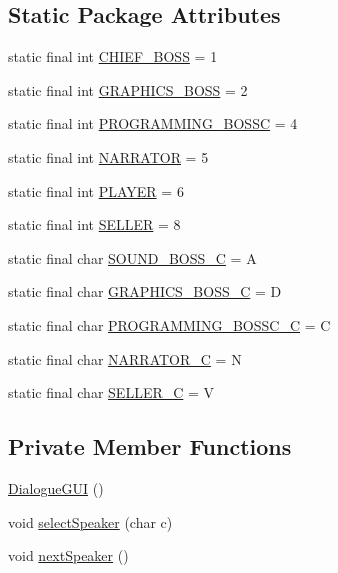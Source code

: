 \subsection*{Static Package Attributes}
\begin{DoxyCompactItemize}
\item 
static final int \mbox{\hyperlink{classgui_1_1_dialogue_g_u_i_aac66d699b6ad6303bb963686bf677e20}{C\+H\+I\+E\+F\+\_\+\+B\+O\+SS}} = 1
\item 
static final int \mbox{\hyperlink{classgui_1_1_dialogue_g_u_i_a6bdff5618468be0a1f501ba3ede32938}{G\+R\+A\+P\+H\+I\+C\+S\+\_\+\+B\+O\+SS}} = 2
\item 
static final int \mbox{\hyperlink{classgui_1_1_dialogue_g_u_i_acc13d83992d3758489e88bd5b4710642}{P\+R\+O\+G\+R\+A\+M\+M\+I\+N\+G\+\_\+\+B\+O\+S\+SC}} = 4
\item 
static final int \mbox{\hyperlink{classgui_1_1_dialogue_g_u_i_af2b0155eb06848c3394af0eba4c9253c}{N\+A\+R\+R\+A\+T\+OR}} = 5
\item 
static final int \mbox{\hyperlink{classgui_1_1_dialogue_g_u_i_a4225bf53175bddf0e95670cf1706f98c}{P\+L\+A\+Y\+ER}} = 6
\item 
static final int \mbox{\hyperlink{classgui_1_1_dialogue_g_u_i_afd8f9475334f31369e54a6210e7f74fc}{S\+E\+L\+L\+ER}} = 8
\item 
static final char \mbox{\hyperlink{classgui_1_1_dialogue_g_u_i_a573395c5551a6b3973ee5eddf5209a85}{S\+O\+U\+N\+D\+\_\+\+B\+O\+S\+S\+\_\+C}} = \textquotesingle{}A\textquotesingle{}
\item 
static final char \mbox{\hyperlink{classgui_1_1_dialogue_g_u_i_a80ed88913fb7e896313a5982f6676504}{G\+R\+A\+P\+H\+I\+C\+S\+\_\+\+B\+O\+S\+S\+\_\+C}} = \textquotesingle{}D\textquotesingle{}
\item 
static final char \mbox{\hyperlink{classgui_1_1_dialogue_g_u_i_a7d069f22881399e220d547eee407b296}{P\+R\+O\+G\+R\+A\+M\+M\+I\+N\+G\+\_\+\+B\+O\+S\+S\+C\+\_\+C}} = \textquotesingle{}C\textquotesingle{}
\item 
static final char \mbox{\hyperlink{classgui_1_1_dialogue_g_u_i_ae36a82546e783d5664fce081403bcf7a}{N\+A\+R\+R\+A\+T\+O\+R\+\_\+C}} = \textquotesingle{}N\textquotesingle{}
\item 
static final char \mbox{\hyperlink{classgui_1_1_dialogue_g_u_i_ab1b72a12c6e654918576233eeeb744b3}{S\+E\+L\+L\+E\+R\+\_\+C}} = \textquotesingle{}V\textquotesingle{}
\end{DoxyCompactItemize}
\subsection*{Private Member Functions}
\begin{DoxyCompactItemize}
\item 
\mbox{\hyperlink{classgui_1_1_dialogue_g_u_i_a576d9a1c4f0132c3910dfd5206a4a094}{Dialogue\+G\+UI}} ()
\item 
void \mbox{\hyperlink{classgui_1_1_dialogue_g_u_i_a69d754e37de68f81fdffadda6b4c8b63}{select\+Speaker}} (char c)
\item 
void \mbox{\hyperlink{classgui_1_1_dialogue_g_u_i_a67f1da29cd81e9836345c7b88a82ffb4}{next\+Speaker}} ()
\end{DoxyCompactItemize}
